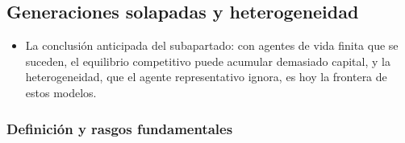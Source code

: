 \documentclass[11pt]{article}
\begin{document}
\subsection{Generaciones solapadas y heterogeneidad}\label{sec:macro-olg}\label{sec:olg}

\begin{itemize}
\item La conclusión anticipada del subapartado: con agentes de vida finita que se suceden, el equilibrio competitivo puede acumular demasiado capital, y la heterogeneidad, que el agente representativo ignora, es hoy la frontera de estos modelos.
\end{itemize}

\subsubsection{Definición y rasgos fundamentales}\label{sec:olg-rasgos}
\end{document}
